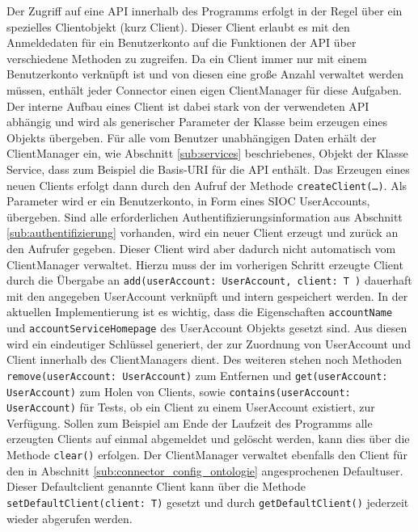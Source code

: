 Der Zugriff auf eine API innerhalb des Programms erfolgt in der Regel über ein spezielles Clientobjekt (kurz Client). Dieser Client erlaubt es mit den Anmeldedaten für ein Benutzerkonto auf die Funktionen der API über verschiedene Methoden zu zugreifen. Da ein Client immer nur mit einem Benutzerkonto verknüpft ist und von diesen eine große Anzahl verwaltet werden müssen, enthält jeder Connector einen eigen ClientManager für diese Aufgaben. Der interne Aufbau eines Client ist dabei stark von der verwendeten API abhängig und wird als generischer Parameter der Klasse beim erzeugen eines Objekts übergeben. Für alle vom Benutzer unabhängigen Daten erhält der ClientManager ein, wie Abschnitt \ref{sub:services} beschriebenes, Objekt der Klasse Service, dass zum Beispiel die Basis-URI für die API enthält. Das Erzeugen eines neuen Clients erfolgt dann durch den Aufruf der Methode \texttt{createClient(\dots)}. Als Parameter wird er ein Benutzerkonto, in Form eines SIOC UserAccounts, übergeben. Sind alle erforderlichen Authentifizierungsinformation aus Abschnitt \ref{sub:authentifizierung} vorhanden, wird ein neuer Client erzeugt und zurück an den Aufrufer gegeben. Dieser Client wird aber dadurch nicht automatisch vom ClientManager verwaltet. Hierzu muss der im vorherigen Schritt erzeugte Client durch die Übergabe an \texttt{add(userAccount: UserAccount, client: T )} dauerhaft mit den angegeben UserAccount verknüpft und intern gespeichert werden. In der aktuellen Implementierung ist es wichtig, dass die Eigenschaften \texttt{accountName} und \texttt{accountServiceHomepage} des UserAccount Objekts gesetzt sind. Aus diesen wird ein eindeutiger Schlüssel generiert, der zur Zuordnung von UserAccount und Client innerhalb des ClientManagers dient. Des weiteren stehen noch Methoden \texttt{remove(userAccount: UserAccount)} zum Entfernen und \texttt{get(userAccount: UserAccount)} zum Holen von Clients, sowie \texttt{contains(userAccount: UserAccount)} für Tests, ob ein Client zu einem UserAccount existiert, zur Verfügung. Sollen zum Beispiel am Ende der Laufzeit des Programms alle erzeugten Clients auf einmal abgemeldet und gelöscht werden, kann dies über die Methode \texttt{clear()} erfolgen. Der ClientManager verwaltet ebenfalls den Client für den in Abschnitt \ref{sub:connector_config_ontologie} angesprochenen Defaultuser. Dieser Defaultclient genannte Client kann über die Methode  \texttt{setDefaultClient(client: T)} gesetzt und durch \texttt{getDefaultClient()} jederzeit wieder abgerufen werden. 


